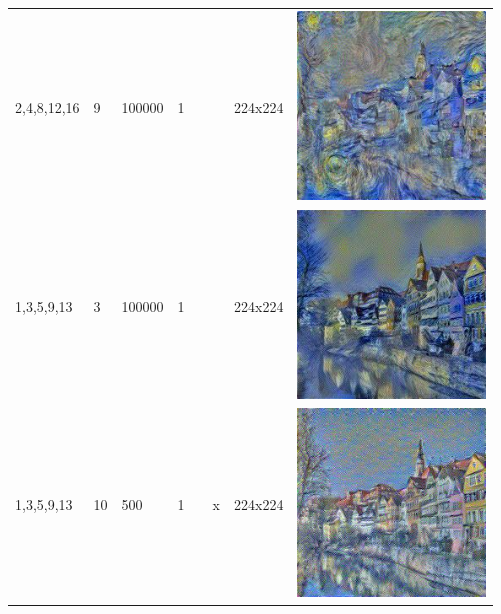 \documentclass[a4paper, 11pt]{article}
\begin{document}
\begin{longtable}{| m{2.5cm} | m{0.5cm} | m{1.2cm} | m{0.5cm} | m{0.5cm} | m{1cm} | m{1.6cm} | c |}
					2,4,8,12,16                         & 9                                   & 100000                            & 1                                   &                                    &                               & 224x224                         & 
					\begin{minipage}{.3\textwidth}
						\includegraphics[width=1\linewidth, height=50mm]{pics/image5}
					\end{minipage} \\
					1,3,5,9,13                          & 3                                   & 100000                            & 1                                   &                                    &                               & 224x224                         & 
					\begin{minipage}{.3\textwidth}
						\includegraphics[width=1\linewidth, height=50mm]{pics/image1}
					\end{minipage} \\
					1,3,5,9,13                          & 10                                  & 500                               & 1                                   &                                    & x                             & 224x224                         & 
					\begin{minipage}{.3\textwidth}
						\includegraphics[width=1\linewidth, height=50mm]{pics/image3}

\end{minipage}
\end{longtable}
\end{document}

